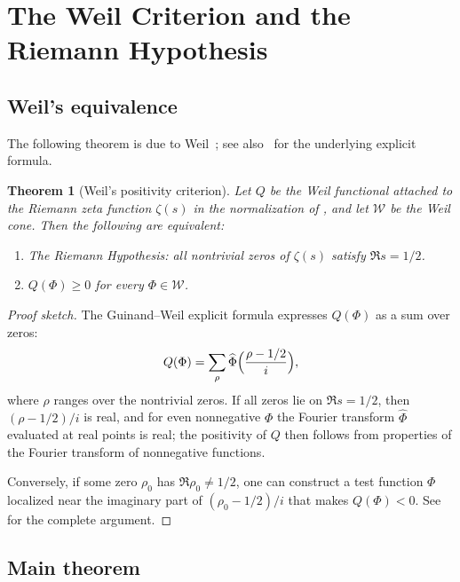 \documentclass[11pt,a4paper]{article}
\newtheorem{theorem}{Theorem}[section]
\theoremstyle{definition}
\newcommand{\WW}{\mathcal{W}}
\begin{document}
\section{The Weil Criterion and the Riemann Hypothesis}\label{sec:weil}

\subsection{Weil's equivalence}

The following theorem is due to Weil~\cite{Weil1952,Weil1972}; see also~\cite{Guinand1948} for the underlying explicit formula.

\begin{theorem}[Weil's positivity criterion]\label{thm:weil-criterion}
Let $Q$ be the Weil functional attached to the Riemann zeta function $\zeta(s)$ in the normalization of , and let $\WW$ be the Weil cone. Then the following are equivalent:
\begin{enumerate}
\item[\textup{(i)}] The Riemann Hypothesis: all nontrivial zeros of $\zeta(s)$ satisfy $\Re s = 1/2$.
\item[\textup{(ii)}] $Q(\Phi) \ge 0$ for every $\Phi \in \WW$.
\end{enumerate}
\end{theorem}

\begin{proof}[Proof sketch]
The Guinand--Weil explicit formula expresses $Q(\Phi)$ as a sum over zeros:
\[
Q(\Phi) = \sum_{\rho} \widehat{\Phi}\Bigl(\frac{\rho - 1/2}{i}\Bigr),
\]
where $\rho$ ranges over the nontrivial zeros. If all zeros lie on $\Re s = 1/2$, then $(\rho - 1/2)/i$ is real, and for even nonnegative $\Phi$ the Fourier transform $\widehat{\Phi}$ evaluated at real points is real; the positivity of $Q$ then follows from properties of the Fourier transform of nonnegative functions.

Conversely, if some zero $\rho_0$ has $\Re \rho_0 \ne 1/2$, one can construct a test function $\Phi$ localized near the imaginary part of $(\rho_0 - 1/2)/i$ that makes $Q(\Phi) < 0$. See~\cite{Weil1972} for the complete argument.
\end{proof}

\subsection{Main theorem}
\end{document}
